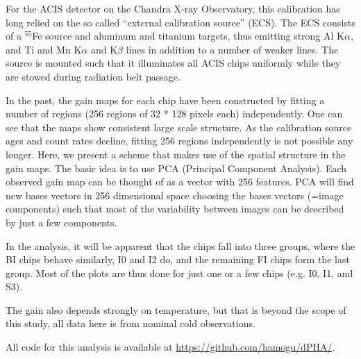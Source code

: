 \documentclass[]{spie}  %
\begin{document}
For the ACIS detector on the Chandra X-ray Observatory, this calibration has long relied on the so called ``external calibration source'' (ECS). The ECS consists of a $^{55}$Fe source and aluminum and titanium targets, thus emitting strong Al K$\alpha$, and Ti and Mn K$\alpha$ and K$\beta$ lines in addition to a number of weaker lines. The source is mounted such that it illuminates all ACIS chips uniformly while they are stowed during radiation belt passage.

In the past, the gain maps for each chip have been constructed by fitting a number of regions (256 regions of 32 * 128 pixels each) independently. One can see that the maps show consistent large scale structure. As the calibration source ages and count rates decline, fitting 256 regions independently is not possible any longer. Here, we present a scheme that makes use of the spatial structure in the gain maps.
The basic idea is to use PCA (Principal Component Analysis). Each observed gain map can be thought of as a vector with 256 features. PCA will find new bases vectors in 256 dimensional space choosing the bases vectors (=image components) such that most of the variability between images can be described by just a few components.

In the analysis, it will be apparent that the chips fall into three groups, where the BI chips behave similarly, I0 and I2 do, and the remaining FI chips form the last group. Most of the plots are thus done for just one or a few chips (e.g. I0, I1, and S3).

The gain also depends strongly on temperature, but that is beyond the scope of this study, all data here is from nominal cold observations.

All code for this analysis is available at \url{https://github.com/hamogu/dPHA/}.
\end{document}
